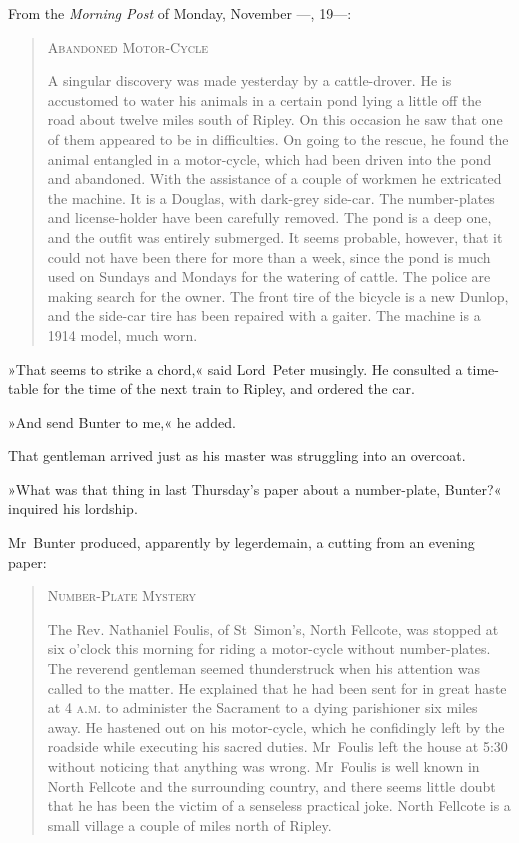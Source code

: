 From the \textit{Morning Post} of Monday, November —, 19—:
\begin{quote}
\begin{center}
\textsc{Abandoned Motor-Cycle}
\end{center}

A singular discovery was made yesterday by a cattle-drover. He is accustomed to water his animals in a certain pond lying a little off the road about twelve miles south of Ripley. On this occasion he saw that one of them appeared to be in difficulties. On going to the rescue, he found the animal entangled in a motor-cycle, which had been driven into the pond and abandoned. With the assistance of a couple of workmen he extricated the machine. It is a Douglas, with dark-grey side-car. The number-plates and license-holder have been carefully removed. The pond is a deep one, and the outfit was entirely submerged. It seems probable, however, that it could not have been there for more than a week, since the pond is much used on Sundays and Mondays for the watering of cattle. The police are making search for the owner. The front tire of the bicycle is a new Dunlop, and the side-car tire has been repaired with a gaiter. The machine is a 1914 model, much worn.
\end{quote}

»That seems to strike a chord,« said Lord~Peter musingly. He consulted a time-table for the time of the next train to Ripley, and ordered the car.

»And send Bunter to me,« he added.

That gentleman arrived just as his master was struggling into an overcoat.

»What was that thing in last Thursday's paper about a number-plate, Bunter?« inquired his lordship.

Mr~Bunter produced, apparently by legerdemain, a cutting from an evening paper:

\begin{quote}
\begin{center}
\textsc{Number-Plate Mystery}
\end{center}

The Rev. Nathaniel Foulis, of St~Simon's, North Fellcote, was stopped at six o'clock this morning for riding a motor-cycle without number-plates. The reverend gentleman seemed thunderstruck when his attention was called to the matter. He explained that he had been sent for in great haste at 4 \textsc{a.m.} to administer the Sacrament to a dying parishioner six miles away. He hastened out on his motor-cycle, which he confidingly left by the roadside while executing his sacred duties.  Mr~Foulis left the house at 5:30 without noticing that anything was wrong. Mr~Foulis is well known in North Fellcote and the surrounding country, and there seems little doubt that he has been the victim of a senseless practical joke. North Fellcote is a small village a couple of miles north of Ripley.
\end{quote}

